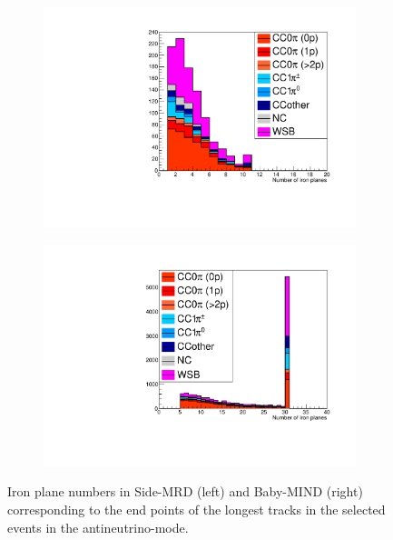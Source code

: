 \begin{figure}[tbh]
  \begin{center}
   \begin{subfigure}{0.48\textwidth}
     \includegraphics[width=0.8\linewidth, angle=270]{fig/RHCMuonPenetration_SideMRD_StoppedOrThroughGoing.pdf}
    \end{subfigure}
  \begin{subfigure}{0.48\textwidth}
      \includegraphics[width=0.8\linewidth, angle=270]{fig/RHCMuonPenetration_DownstreamMRD_StoppedOrThroughGoing.pdf}
    \end{subfigure}    
    \end{center}
  \caption{
Iron plane numbers in Side-MRD (left) and Baby-MIND (right) corresponding to the end points of the longest tracks in the selected events in the antineutrino-mode.
}
\label{fig:endpoint_longest_track_antineutrino}
\end{figure}

